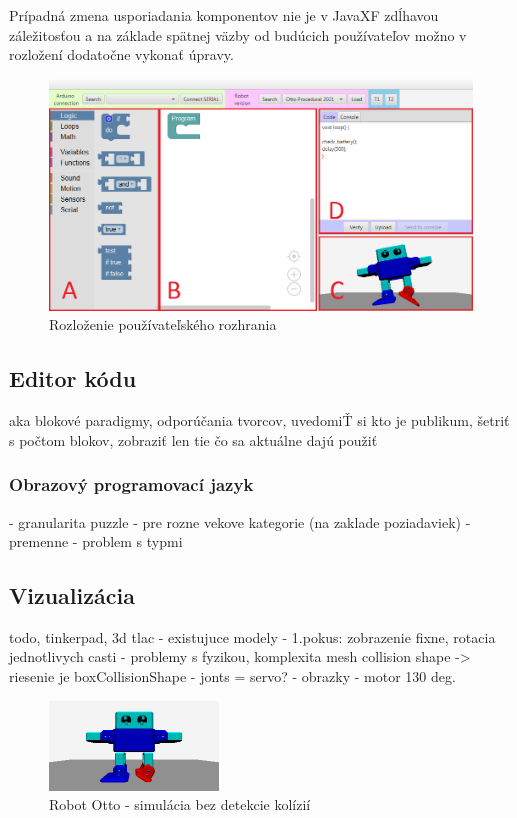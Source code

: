 Prípadná zmena usporiadania komponentov nie je v JavaXF zdĺhavou záležitosťou a na základe spätnej väzby od budúcich používateľov možno v rozložení dodatočne vykonať úpravy.

\begin{figure}
\centerline{\includegraphics[width=1\textwidth]{images/rozlozenie-gui}}
\caption[Rozloženie používateľského rozhrania]{Rozloženie používateľského rozhrania}
\label{obr:gui-layout}
\end{figure}


\subsection{Editor kódu}
aka blokové paradigmy, odporúčania tvorcov, uvedomiŤ si kto je publikum, šetriť s počtom blokov, zobraziť len tie čo sa aktuálne dajú použiť

\subsubsection{Obrazový programovací jazyk}
- granularita puzzle
- pre rozne vekove kategorie (na zaklade poziadaviek)
- premenne - problem s typmi



\subsection{Vizualizácia}
todo, tinkerpad, 3d tlac - existujuce modely
- 1.pokus: zobrazenie fixne, rotacia jednotlivych casti
- problemy s fyzikou, komplexita mesh collision shape -> riesenie je boxCollisionShape
- jonts = servo?
- obrazky - motor 130 deg.

\begin{figure}
\centerline{\includegraphics[width=0.4\textwidth]{images/otto-without-collision}}
\caption[Robot Otto - simulácia bez detekcie kolízií]{Robot Otto - simulácia bez detekcie kolízií}
\label{obr:otto-without-collision}
\end{figure}


